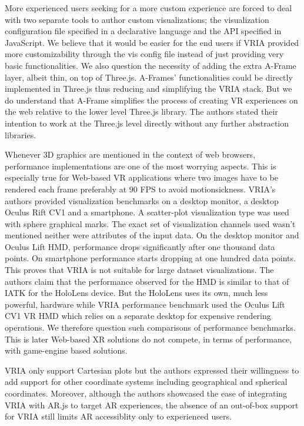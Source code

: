 \documentclass{vgtc}                          %
\begin{document}
\smallskip

\noindent More experienced users seeking for a more custom experience are
forced to deal with two separate tools to author custom visualizations;
the visualization configuration file specified in a declarative language and
the API specified in JavaScript. We believe that it would be easier for the end users if VRIA
provided more customizability through the vis config file instead of just
providing very basic functionalities. We also question the necessity of adding
the extra A-Frame layer, albeit thin, on top of Three.js. A-Frames'
functionalities could be directly implemented in Three.js thus reducing and
simplifying the VRIA stack. But we do understand that A-Frame simplifies the
process of creating VR experiences on the web relative to the lower level
Three.js library. The authors stated their intention to work at the Three.js
level directly without any further abstraction libraries.

\smallskip

\noindent Whenever 3D graphics are mentioned in the context of web browsers,
performance implementations are one of the most worrying aspects. This is
especially true for Web-based VR applications where two images have to be
rendered each frame preferably at 90 FPS to avoid motionsickness. VRIA's
authors provided visualization benchmarks on a desktop monitor, a desktop
Oculus Rift CV1 and a smartphone. A scatter-plot visualization type was used
with sphere graphical marks. The exact set of visualization channels used
wasn't mentioned neither were attributes of the input data. On the desktop
monitor and Oculus Lift HMD, performance drops significantly after one
thousand data points. On smartphone performance starts dropping at one hundred
data points. This proves that VRIA is not suitable for large dataset
visualizations. The authors claim that the performance observed for the HMD
is similar to that of IATK for the HoloLens device. But the HoloLens uses
its own, much less powerful, hardware while VRIA performance benchmark used
the Oculus Lift CV1 VR HMD which relies on a separate desktop for expensive
rendering operations. We therefore question such comparisons of performance
benchmarks. This is later Web-based XR solutions do not compete,
in terms of performance, with game-engine based solutions.

\smallskip

\noindent VRIA only support Cartesian plots but the authors expressed their
willingness to add support for other coordinate systems including geographical
and spherical coordinates.
Moreover, although the authors showcased the ease of integrating VRIA with
AR.js to target AR experiences, the absence of an out-of-box support for VRIA
still limits AR accessiblity only to experienced users.
\end{document}
